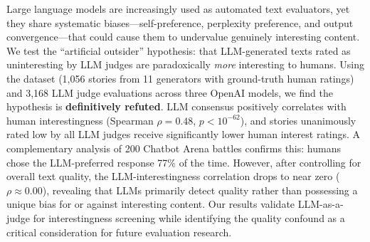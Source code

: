 Large language models are increasingly used as automated text evaluators, yet they share systematic biases---self-preference, perplexity preference, and output convergence---that could cause them to undervalue genuinely interesting content.
We test the ``artificial outsider'' hypothesis: that LLM-generated texts rated as uninteresting by LLM judges are paradoxically \emph{more} interesting to humans.
Using the \hanna dataset (1,056 stories from 11 generators with ground-truth human ratings) and 3,168 LLM judge evaluations across three OpenAI models, we find the hypothesis is \textbf{definitively refuted}.
LLM consensus positively correlates with human interestingness (Spearman $\rho = 0.48$, $p < 10^{-62}$), and stories unanimously rated low by all LLM judges receive significantly lower human interest ratings.
A complementary analysis of 200 Chatbot Arena battles confirms this: humans chose the LLM-preferred response 77\% of the time.
However, after controlling for overall text quality, the LLM-interestingness correlation drops to near zero ($\rho \approx 0.00$), revealing that LLMs primarily detect quality rather than possessing a unique bias for or against interesting content.
Our results validate LLM-as-a-judge for interestingness screening while identifying the quality confound as a critical consideration for future evaluation research.
